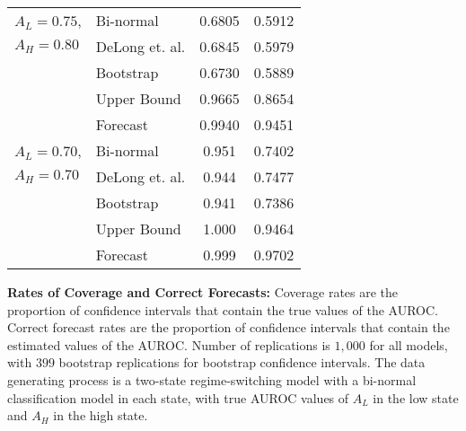 \begin{table}[h!]
\begin{center}
\begin{tabular}{l l c c }
    \hline


$A_L = 0.75$, &
          Bi-normal &  0.6805 & 0.5912 \\
$A_H = 0.80$ &
     DeLong et. al. &  0.6845 & 0.5979 \\
 &         Bootstrap &  0.6730 & 0.5889 \\
 &       Upper Bound &  0.9665 & 0.8654 \\
 &          Forecast &  0.9940 & 0.9451 \\

    \hline


$A_L = 0.70$, &
          Bi-normal  &  0.951 & 0.7402 \\
$A_H = 0.70$ &
     DeLong et. al.  &  0.944 & 0.7477 \\
 &         Bootstrap  &  0.941 & 0.7386 \\
 &       Upper Bound  &  1.000 & 0.9464 \\
 &          Forecast  &  0.999 & 0.9702 \\

    \hline

    \end{tabular}


\end{center}

    \footnotesize

        \textbf{Rates of Coverage and Correct Forecasts:}
        Coverage rates are the proportion of confidence intervals that contain the true values of the AUROC.
        Correct forecast rates are the proportion of confidence intervals that contain the estimated values of the AUROC.
        Number of replications is $1,000$ for all models, with $399$ bootstrap replications for bootstrap confidence intervals.
        The data generating process is a two-state regime-switching model with a bi-normal classification model in each state,
        with true AUROC values of $A_L$ in the low state and $A_H$ in the high state.





\end{table}



